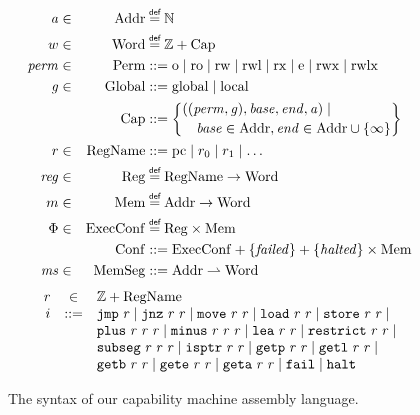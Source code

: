 \documentclass[compsoc,conference,letterpaper,fleqn]{IEEEtran}
\newcommand{\parfun}{\rightharpoonup}
\newcommand{\var}[1]{\mathit{#1}}
\newcommand{\hs}{\var{ms}}
\newcommand{\ms}{\hs}
\newcommand{\hv}{\var{r}}
\newcommand{\rv}{\var{r}}
\newcommand{\lv}{\var{r}}
\newcommand{\gl}{\var{g}}
\newcommand{\pcreg}{\mathrm{pc}}
\newcommand{\addr}{\var{a}}
\newcommand{\start}{\var{base}}
\newcommand{\addrend}{\var{end}}
\newcommand{\reg}{\var{reg}}
\newcommand{\perm}{\var{perm}}
\newcommand{\failed}{\mathit{failed}}
\newcommand{\halted}{\mathit{halted}}
\newcommand{\plaindom}[1]{\mathrm{#1}}
\newcommand{\Caps}{\plaindom{Cap}}
\newcommand{\Words}{\plaindom{Word}}
\newcommand{\Addrs}{\plaindom{Addr}}
\newcommand{\ExecConfs}{\plaindom{ExecConf}}
\newcommand{\RegName}{\plaindom{RegName}}
\newcommand{\Regs}{\plaindom{Reg}}
\newcommand{\Heaps}{\plaindom{Mem}}
\newcommand{\HeapSegments}{\plaindom{MemSeg}}
\newcommand{\MemSegments}{\HeapSegments}
\newcommand{\Confs}{\plaindom{Conf}}
\newcommand{\nats}{\mathbb{N}}
\newcommand{\ints}{\mathbb{Z}}
\newcommand{\Perms}{\plaindom{Perm}}
\newcommand{\Globals}{\plaindom{Global}}
\newcommand{\zinstr}[1]{\mathtt{#1}}
\newcommand{\fail}{\zinstr{fail}}
\newcommand{\halt}{\zinstr{halt}}
\newcommand{\oneinstr}[2]{
  \ifthenelse{\equal{#2}{}}
  {\zinstr{#1}}
  {\zinstr{#1} \; #2}
}
\newcommand{\jmp}[1]{\oneinstr{jmp}{#1}}
\newcommand{\twoinstr}[3]{
  \ifthenelse{\equal{#2#3}{}}
  {\zinstr{#1}}
  {\zinstr{#1} \; #2 \; #3}
}
\newcommand{\restricttwo}[2]{\twoinstr{restrict}{#1}{#2}}
\newcommand{\jnz}[2]{\twoinstr{jnz}{#1}{#2}}
\newcommand{\isptr}[2]{\twoinstr{isptr}{#1}{#2}}
\newcommand{\geta}[2]{\twoinstr{geta}{#1}{#2}}
\newcommand{\getb}[2]{\twoinstr{getb}{#1}{#2}}
\newcommand{\gete}[2]{\twoinstr{gete}{#1}{#2}}
\newcommand{\getp}[2]{\twoinstr{getp}{#1}{#2}}
\newcommand{\getl}[2]{\twoinstr{getl}{#1}{#2}}
\newcommand{\move}[2]{\twoinstr{move}{#1}{#2}}
\newcommand{\store}[2]{\twoinstr{store}{#1}{#2}}
\newcommand{\load}[2]{\twoinstr{load}{#1}{#2}}
\newcommand{\lea}[2]{\twoinstr{lea}{#1}{#2}}
\newcommand{\threeinstr}[4]{
  \ifthenelse{\equal{#2#3#4}{}}
  {\zinstr{#1}}
  {\zinstr{#1} \; #2 \; #3 \; #4}
}
\newcommand{\subseg}[3]{\threeinstr{subseg}{#1}{#2}{#3}}
\newcommand{\plus}[3]{\threeinstr{plus}{#1}{#2}{#3}}
\newcommand{\minus}[3]{\threeinstr{minus}{#1}{#2}{#3}}
\newcommand{\plainperm}[1]{\mathrm{#1}}
\newcommand{\noperm}{\plainperm{o}}
\newcommand{\readonly}{\plainperm{ro}}
\newcommand{\readwrite}{\plainperm{rw}}
\newcommand{\exec}{\plainperm{rx}}
\newcommand{\entry}{\plainperm{e}}
\newcommand{\rwx}{\plainperm{rwx}}
\newcommand{\readwritel}{\plainperm{rwl}}
\newcommand{\rwlx}{\plainperm{rwlx}}
\newcommand{\local}{\plainperm{local}}
\newcommand{\glob}{\plainperm{global}}
\newcommand{\isdef}{\mathrel{\overset{\makebox[0pt]{\mbox{\normalfont\tiny\sffamily def}}}{=}}}
\newcommand\bnfdef{\mathrel{::=}}
\begin{document}
\begin{figure}
  \begin{align*}
    \addr   &\in& \Addrs &\isdef \nats\\
    w &\in&\Words &\isdef \ints + \Caps \\
    \perm   &\in& \Perms &::= \noperm \mid \readonly\mid \readwrite\mid \readwritel\mid \exec\mid \entry\mid \rwx\mid \rwlx\\
    \gl&\in&\Globals & ::= \glob \mid \local \\
     && \Caps  &::= \left\{
                       \begin{multlined}
                         ((\perm,\gl),\start,\addrend,\addr)\mid\\
                         \start\in\Addrs,\addrend \in
                         \Addrs\cup \{\infty\}
                       \end{multlined} \right\}\\
    r       &\in& \RegName&\bnfdef \pcreg\mid r_0\mid r_1\mid\ldots\\
    \reg &\in& \Regs  &\isdef \RegName \rightarrow \Words\\
    m&\in& \Heaps &\isdef \Addrs \rightarrow \Words \\
    \Phi    &\in& \ExecConfs  &\isdef \Regs \times \Heaps \\
    &&\Confs &::= \ExecConfs + \{\failed \} + \{\halted\} \times \Heaps \\
    \ms     &\in& \MemSegments &::= \Addrs \parfun \Words
  \end{align*}
  \begin{equation*}
  \begin{array}{rcl}
    \rv    &\in& \ints + \RegName \\
    i      &::=& 
                 \jmp{\lv} \mid 
                 \jnz{\lv}{\rv} \mid
                 \move{\lv}{\rv} \mid 
                 \load{\lv}{\hv} \mid 
                 \store{\hv}{\rv} \mid  \\
           &   & \plus{\lv}{\rv}{\rv} \mid 
                 \minus{\lv}{\rv}{\rv} \mid 
                 \lea{\lv}{\rv} \mid 
                 \restricttwo{\lv}{\rv} \mid \\
           &   & \subseg{\lv}{\rv}{\rv} \mid  
                 \isptr{\lv}{\rv} \mid 
                 \getp{\lv}{\lv} \mid 
                 \getl{\lv}{\lv} \mid\\ 
           &   & \getb{\lv}{\lv} \mid
                 \gete{\lv}{\lv} \mid
                 \geta{\lv}{\lv} \mid 
                 \fail \mid
                 \halt 
  \end{array}
\end{equation*}
  \caption{The syntax of our capability machine assembly language.}
  \label{fig:syntax}
\end{figure}
\end{document}

